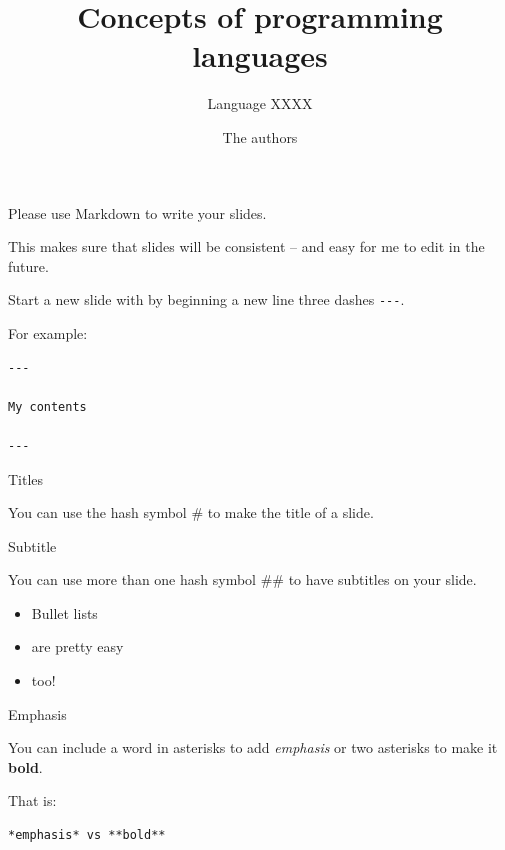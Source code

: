 \documentclass[ignorenonframetext,]{beamer}
\title{Concepts of programming languages}
\subtitle{Language XXXX}
\author{The authors}
\date{}
\providecommand{\tightlist}{%
  \setlength{\itemsep}{0pt}\setlength{\parskip}{0pt}}
\begin{document}
\frame{\titlepage}

\begin{frame}

Please use Markdown to write your slides.

This makes sure that slides will be consistent – and easy for me to edit
in the future.

\end{frame}

\begin{frame}[fragile]

Start a new slide with by beginning a new line three dashes
\texttt{-\/-\/-}.

For example:

\begin{verbatim}
---

My contents

---
\end{verbatim}

\end{frame}

\begin{frame}{%
\protect\hypertarget{titles}{%
Titles}}

You can use the hash symbol \# to make the title of a slide.

\begin{block}{Subtitle}

You can use more than one hash symbol \#\# to have subtitles on your
slide.

\end{block}

\end{frame}

\begin{frame}

\begin{itemize}
\tightlist
\item
  Bullet lists
\item
  are pretty easy
\item
  too!
\end{itemize}

\end{frame}

\begin{frame}[fragile]{%
\protect\hypertarget{emphasis}{%
Emphasis}}

You can include a word in asterisks to add \emph{emphasis} or two
asterisks to make it \textbf{bold}.

That is:

\begin{verbatim}
*emphasis* vs **bold**
\end{verbatim}

\end{frame}
\end{document}
